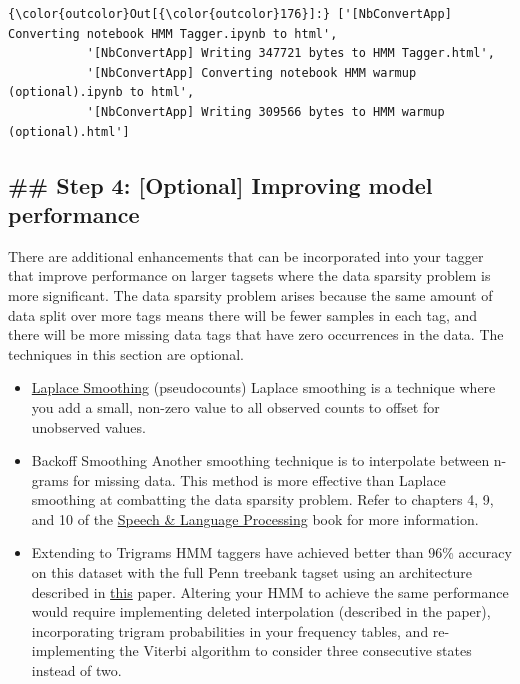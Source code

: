\documentclass[11pt]{article}
\begin{document}
\begin{Verbatim}[commandchars=\\\{\}]
{\color{outcolor}Out[{\color{outcolor}176}]:} ['[NbConvertApp] Converting notebook HMM Tagger.ipynb to html',
           '[NbConvertApp] Writing 347721 bytes to HMM Tagger.html',
           '[NbConvertApp] Converting notebook HMM warmup (optional).ipynb to html',
           '[NbConvertApp] Writing 309566 bytes to HMM warmup (optional).html']
\end{Verbatim}
            
    \hypertarget{step-4-optional-improving-model-performance}{%
\subsection{\#\# Step 4: {[}Optional{]} Improving model
performance}\label{step-4-optional-improving-model-performance}}

There are additional enhancements that can be incorporated into your
tagger that improve performance on larger tagsets where the data
sparsity problem is more significant. The data sparsity problem arises
because the same amount of data split over more tags means there will be
fewer samples in each tag, and there will be more missing data tags that
have zero occurrences in the data. The techniques in this section are
optional.

\begin{itemize}
\item
  \href{https://en.wikipedia.org/wiki/Additive_smoothing}{Laplace
  Smoothing} (pseudocounts) Laplace smoothing is a technique where you
  add a small, non-zero value to all observed counts to offset for
  unobserved values.
\item
  Backoff Smoothing Another smoothing technique is to interpolate
  between n-grams for missing data. This method is more effective than
  Laplace smoothing at combatting the data sparsity problem. Refer to
  chapters 4, 9, and 10 of the
  \href{https://web.stanford.edu/~jurafsky/slp3/}{Speech \& Language
  Processing} book for more information.
\item
  Extending to Trigrams HMM taggers have achieved better than 96\%
  accuracy on this dataset with the full Penn treebank tagset using an
  architecture described in
  \href{http://www.coli.uni-saarland.de/~thorsten/publications/Brants-ANLP00.pdf}{this}
  paper. Altering your HMM to achieve the same performance would require
  implementing deleted interpolation (described in the paper),
  incorporating trigram probabilities in your frequency tables, and
  re-implementing the Viterbi algorithm to consider three consecutive
  states instead of two.
\end{itemize}
\end{document}
